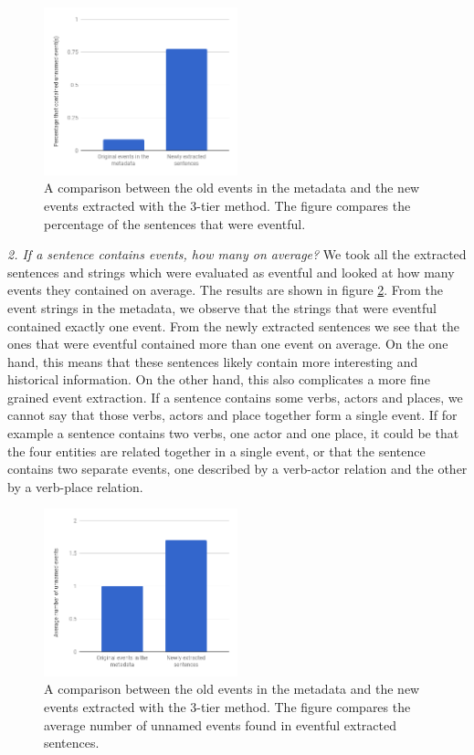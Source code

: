 \documentclass[a4paper, 10pt, conference]{ieeeconf}      %
\begin{document}
\begin{figure}
  \centering
  \includegraphics[width= 0.5\textwidth]{sentencesWithEvent2}
  \caption{A comparison between the old events in the metadata and the new events extracted with the 3-tier method. The figure compares the percentage of the sentences that were eventful.}
  \label{percentage eventful}
\end{figure}

\textit{2. If a sentence contains events, how many on average?}
We took all the extracted sentences and strings which were evaluated as eventful and looked at how many events they contained on average. The results are shown in figure \ref{events per sentence}. From the event strings in the metadata, we observe that the strings that were eventful contained exactly one event. From  the newly extracted sentences we see that the ones that were eventful contained more than one event on average. On the one hand, this means that these sentences likely contain more interesting and historical information. On the other hand, this also complicates a more fine grained event extraction. If a sentence contains some verbs, actors and places, we cannot say that those verbs, actors and place together form a single event. If for example a sentence contains two verbs, one actor and one place, it could be that the four entities are related together in a single event, or that the sentence contains two separate events, one described by a verb-actor relation and the other by a verb-place relation.

\begin{figure}
  \centering
  \includegraphics[width= 0.5\textwidth]{EventsPerSentence2}
  \caption{A comparison between the old events in the metadata and the new events extracted with the 3-tier method. The figure compares the average number of unnamed events found in eventful extracted sentences.}
  \label{events per sentence}
\end{figure}
\end{document}
